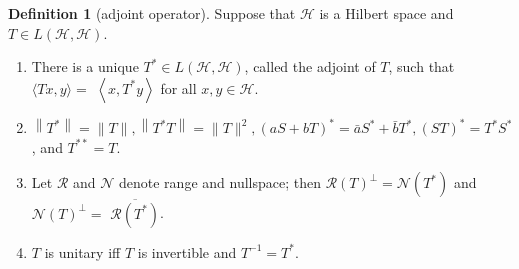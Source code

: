 \documentclass[12pt,a4paper]{book}
\newenvironment{enu}{\begin{enumerate}[(1)]}{\end{enumerate}}
\theoremstyle{definition}
\newtheorem{defn}{Definition}[section]
\begin{document}
\begin{defn}[adjoint operator]
    Suppose that $\mathcal{H}$ is a Hilbert space and $T \in L(\mathcal{H}, \mathcal{H})$.
\begin{enu} 
    \item There is a unique $T^* \in L(\mathcal{H}, \mathcal{H})$, called the adjoint of $T$, such that $\langle T x, y\rangle=$ $\left\langle x, T^* y\right\rangle$ for all $x, y \in \mathcal{H}$. 
    \item $\left\|T^*\right\|=\|T\|,\left\|T^* T\right\|=\|T\|^2,(a S+b T)^*=\bar{a} S^*+\bar{b} T^*,(S T)^*=T^* S^*$, and $T^{* *}=T$.
    \item Let $\mathcal{R}$ and $\mathcal{N}$ denote range and nullspace; then $\mathcal{R}(T)^{\perp}=\mathcal{N}\left(T^*\right)$ and $\mathcal{N}(T)^{\perp}=$ $\overline{\mathcal{R}\left(T^*\right)}$.
    \item $T$ is unitary iff $T$ is invertible and $T^{-1}=T^*$.
\end{enu}

\end{defn}
\end{document}
